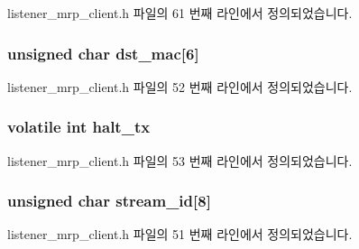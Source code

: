 listener\+\_\+mrp\+\_\+client.\+h 파일의 61 번째 라인에서 정의되었습니다.

\subsubsection[{\texorpdfstring{dst\+\_\+mac}{dst_mac}}]{\setlength{\rightskip}{0pt plus 5cm}unsigned char dst\+\_\+mac\mbox{[}6\mbox{]}}\hypertarget{structmrp__listener__ctx_adfd737d7370a81c521ecc86600c9922a}{}\label{structmrp__listener__ctx_adfd737d7370a81c521ecc86600c9922a}


listener\+\_\+mrp\+\_\+client.\+h 파일의 52 번째 라인에서 정의되었습니다.

\subsubsection[{\texorpdfstring{halt\+\_\+tx}{halt_tx}}]{\setlength{\rightskip}{0pt plus 5cm}volatile int halt\+\_\+tx}\hypertarget{structmrp__listener__ctx_a7c8176263e9704aa667fc335cc818a3f}{}\label{structmrp__listener__ctx_a7c8176263e9704aa667fc335cc818a3f}


listener\+\_\+mrp\+\_\+client.\+h 파일의 53 번째 라인에서 정의되었습니다.

\subsubsection[{\texorpdfstring{stream\+\_\+id}{stream_id}}]{\setlength{\rightskip}{0pt plus 5cm}unsigned char stream\+\_\+id\mbox{[}8\mbox{]}}\hypertarget{structmrp__listener__ctx_a190ce42cbfefb20ada402ce90519cc32}{}\label{structmrp__listener__ctx_a190ce42cbfefb20ada402ce90519cc32}


listener\+\_\+mrp\+\_\+client.\+h 파일의 51 번째 라인에서 정의되었습니다.

